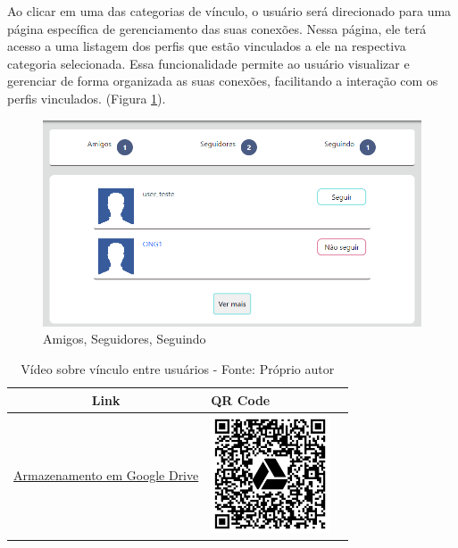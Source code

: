Ao clicar em uma das categorias de vínculo, o usuário será direcionado para uma página específica de gerenciamento das suas conexões. Nessa página, ele terá acesso a uma listagem dos perfis que estão vinculados a ele na respectiva categoria selecionada. Essa funcionalidade permite ao usuário visualizar e gerenciar de forma organizada as suas conexões, facilitando a interação com os perfis vinculados. (Figura \ref{fig:amigosSeguidoresSeguindo}).\\

\begin{figure}[htb]
     \centering
     \includegraphics[width=12cm]{arquivos/Figuras/amigosSeguidoresSeguindo.png}
     \caption{Amigos, Seguidores, Seguindo}
     \label{fig:amigosSeguidoresSeguindo}
\end{figure}

\begin{table}[htbp]
\centering
\renewcommand{\arraystretch}{1.5}
\begin{tabular}{|c|>{\centering\arraybackslash}m{6cm}|c|}
\hline
\textbf{Link} & \textbf{QR Code} \\
\hline
\href{https://drive.google.com/file/d/1_f2zeal7lgCEX0xUcvcWqX4u0Sg0Nmqa/view?usp=drive_link}{Armazenamento em Google Drive} & \includegraphics[width=3.5cm]{arquivos/ImgLinks/vinculo.png} \\
\hline
\end{tabular}
\caption*{Vídeo sobre vínculo entre usuários - Fonte: Próprio autor}
\end{table}

